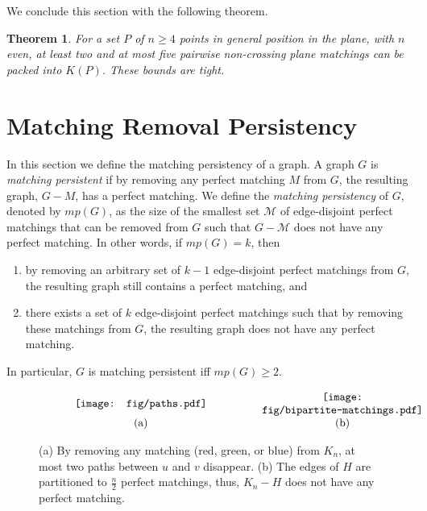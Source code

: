 \documentclass[11pt,a4paper]{article}
\newcommand{\Kn}[1]{K#1}
\newtheorem{theorem}{Theorem}
\begin{document}
We conclude this section with the following theorem.
\begin{theorem}
For a set $P$ of $n\ge 4$ points in general position in the plane, with $n$ even, at least two and at most five pairwise non-crossing plane matchings can be packed into $\Kn{(P)}$. These bounds are tight.
\end{theorem}

\section{Matching Removal Persistency}
\label{persistency-section}
In this section we define the matching persistency of a graph. A graph $G$ is {\em matching persistent} if by removing any perfect matching $M$ from $G$, the resulting graph, $G-M$, has a perfect matching. We define the {\em matching persistency} of $G$, denoted by $mp(G)$, as the size of the smallest set $\mathcal{M}$ of edge-disjoint perfect matchings that can be removed from $G$ such that $G-\mathcal{M}$ does not have any perfect matching. 
In other words, if $mp(G)=k$, then

\begin{enumerate}
 \item by removing an arbitrary set of $k-1$ edge-disjoint perfect matchings from $G$, the resulting graph still contains a perfect matching, and 
\item there exists a set of $k$ edge-disjoint perfect matchings such that by removing these matchings from $G$, the resulting graph does not have any perfect matching.
\end{enumerate}

In particular, $G$ is matching persistent iff $mp(G)\ge 2$.

\begin{figure}[htb]
  \centering
\setlength{\tabcolsep}{0in}
  $\begin{tabular}{cc}
\multicolumn{1}{m{.5\columnwidth}}{\centering\texttt{[image: fig/paths.pdf]}}&
\multicolumn{1}{m{.5\columnwidth}}{\centering\texttt{[image: fig/bipartite-matchings.pdf]}}\\
(a) & (b)
\end{tabular}$
  \caption{(a) By removing any matching (red, green, or blue) from $K_n$, at most two paths between $u$ and $v$ disappear. (b) The edges of $H$ are partitioned to $\frac{n}{2}$ perfect matchings, thus, $K_n-H$ does not have any perfect matching.}
\label{path-matching}
\end{figure}
\end{document}
